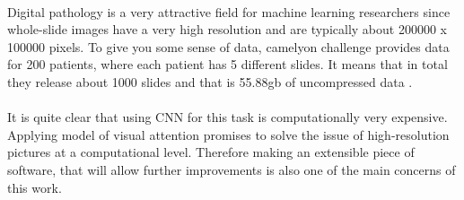 \paragraph{}
Digital pathology is a very attractive field for machine learning researchers
since whole-slide images have a very high resolution and are typically about 200000 x 100000 pixels.
To give you some sense of data, camelyon challenge provides data for 200 patients,
where each patient has 5 different slides. It means that in total they release
about 1000 slides and that is 55.88gb of uncompressed data \cite{CAMEL}.

\paragraph{}
It is quite clear that using CNN for this task is computationally very expensive.
Applying model of visual attention promises to solve the issue of
high-resolution pictures at a computational level.
Therefore making an extensible piece of software, that will allow further
improvements is also one of the main concerns of this work.




